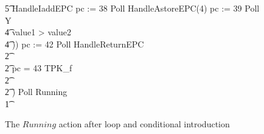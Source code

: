 \begin{figure}[tp!]
{\begin{circus}
    \t5 HandleIaddEPC \circseq pc := 38 \circseq Poll \circseq HandleAstoreEPC(4) \circseq pc := 39 \circseq Poll \circseq Y \\
    \t4 {} \circelse value1 > value2 \circthen \Skip \\
    \t4 \circfi)) \circseq pc := 42 \circseq Poll \circseq HandleReturnEPC \\
    \t2 {} \cdots {} \\
    \t2 {} \circelse pc = 43 \circthen TPK\_f \\
    \t2 {} \cdots {} \\
    \t2 \circfi) \circseq Poll \circseq Running \\
    \t1 \circfi
  \end{circus}
  }
  \caption{The $Running$ action after loop and conditional introduction}
  \label{loop-and-conditional-introduction-example-figure}
\end{figure}

